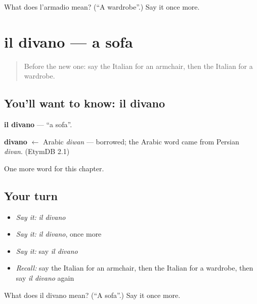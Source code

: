 \begin{tcolorbox}[breakable,colback=teal!4,colframe=teal!35!black,title={Before you move on}]
What does l'armadio mean? (\textquotedblleft{}A wardrobe\textquotedblright{}.) Say it once more.
\end{tcolorbox}
\section[il divano]{il divano — a sofa}

\label{lesson:IT-C98-divano}



\begin{quote}
Before the new one: say the Italian for an armchair, then the Italian for a wardrobe.
\end{quote}

\subsection*{You'll want to know: il divano}
\textbf{il divano} — \textquotedblleft{}a sofa\textquotedblright{}.

\begin{cousinweb}
\textbf{divano} $\leftarrow$ Arabic \emph{diwan} — borrowed; the Arabic word came from Persian \emph{divan}. (EtymDB 2.1)
\end{cousinweb}

\begin{grammarlens}[title={What you've built}]
One more word for this chapter.
\end{grammarlens}

\subsection*{Your turn}
\begin{itemize}
\raggedright
  \item \emph{Say it:} \emph{il divano}
  \item \emph{Say it:} \emph{il divano}, once more
  \item \emph{Say it:} say \emph{il divano}
  \item \emph{Recall:} say the Italian for an armchair, then the Italian for a wardrobe, then say \emph{il divano} again
\end{itemize}

\begin{tcolorbox}[breakable,colback=teal!4,colframe=teal!35!black,title={Before you move on}]
What does il divano mean? (\textquotedblleft{}A sofa\textquotedblright{}.) Say it once more.
\end{tcolorbox}
